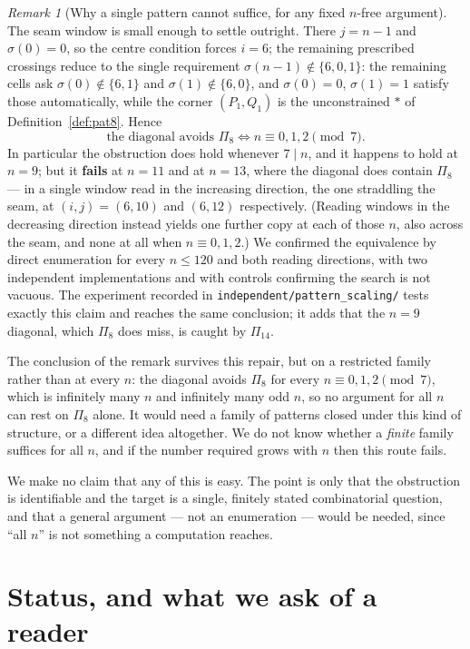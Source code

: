 \documentclass[11pt,a4paper]{article}
\theoremstyle{plain}
\theoremstyle{definition}
\theoremstyle{remark}
\newtheorem{remark}[theorem]{Remark}
\begin{document}
\begin{remark}[Why a single pattern cannot suffice, for any fixed $n$-free
argument]
The seam window is small enough to settle outright. There $j=n-1$ and
$\sigma(0)=0$, so the centre condition forces $i=6$; the remaining prescribed
crossings reduce to the single requirement $\sigma(n-1)\notin\{6,0,1\}$: the
remaining cells ask $\sigma(0)\notin\{6,1\}$ and $\sigma(1)\notin\{6,0\}$, and
$\sigma(0)=0$, $\sigma(1)=1$ satisfy those automatically, while the corner
$(P_1,Q_1)$ is the unconstrained $\ast$ of Definition~\ref{def:pat8}. Hence
\[
  \text{the diagonal avoids } \Pi_8
  \iff n\equiv 0,1,2 \pmod 7 .
\]
In particular the obstruction does hold whenever $7\mid n$, and it happens to
hold at $n=9$; but it \textbf{fails} at $n=11$ and at $n=13$, where the
diagonal does contain $\Pi_8$ --- in a single window read in the increasing
direction, the one straddling the seam, at $(i,j)=(6,10)$ and $(6,12)$
respectively. (Reading windows in the decreasing direction instead yields one
further copy at each of those $n$, also across the seam, and none at all when
$n\equiv 0,1,2$.) We confirmed the equivalence by direct enumeration for every
$n\le 120$ and both reading directions, with two independent implementations
and with controls confirming the search is not vacuous. The experiment recorded
in \texttt{independent/pattern\_scaling/} tests exactly this claim and reaches
the same conclusion; it adds that the $n=9$ diagonal, which $\Pi_8$ does miss,
is caught by $\Pi_{14}$.

The conclusion of the remark survives this repair, but on a restricted family
rather than at every $n$: the diagonal avoids $\Pi_8$ for every
$n\equiv 0,1,2\pmod 7$, which is infinitely many $n$ and infinitely many odd
$n$, so no argument for all $n$ can rest on $\Pi_8$ alone. It would need a
family of patterns closed under this kind of structure, or a different idea
altogether. We do not know whether a \emph{finite} family suffices for all $n$,
and if the number required grows with $n$ then this route fails.
\end{remark}

\noindent
We make no claim that any of this is easy. The point is only that the
obstruction is identifiable and the target is a single, finitely stated
combinatorial question, and that a general argument --- not an enumeration ---
would be needed, since ``all $n$'' is not something a computation reaches.

\section{Status, and what we ask of a reader}\label{sec:status}
\end{document}
